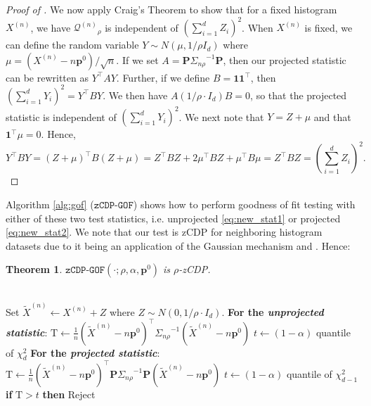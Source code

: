 \documentclass[twoside,letterpaper]{article} \usepackage{aistats2017}
\newtheorem{theorem}{Theorem}[section]
\theoremstyle{definition}
\theoremstyle{remark}
\begin{document}
\begin{proof}[Proof of ]
We now apply Craig's Theorem to show that for a fixed histogram ${X^{({n})}}$, we have ${\pmb{\mathcal{Q}}^{({n})}}_{\rho} $ is independent of $\left(\sum_{i=1}^d Z_i \right)^2$. When ${X^{({n})}}$ is fixed, we can define the random variable $Y \sim N\left(\mu, 1/\rho I_d \right)$ where $\mu = ({X^{({n})}}- n{{\mathbf{p}}^0})/\sqrt{n}$.  If we set $A = {\pmb{P}}{{\Sigma}_{{n\rho}}}^{-1}{\pmb{P}}$, then our projected statistic can be rewritten as $Y^\intercal AY$.  Further, if we define $B = {\pmb{1}}{\pmb{1}}^\intercal$, then $\left(\sum_{i=1}^d Y_i\right)^2 = Y^\intercal BY$.  We then have $A\left( 1/\rho\cdot  I_d\right) B = 0$, so that the projected statistic is independent of $\left(\sum_{i=1}^d Y_i\right)^2$.  We next note that $Y = Z + \mu$ and that ${\pmb{1}}^\intercal\mu = 0$.  Hence, 
$$
Y^\intercal BY = (Z+ \mu)^\intercal B (Z+\mu) = Z^\intercal BZ + 2\mu^\intercal B Z + \mu^\intercal B \mu = Z^\intercal B Z = \left(\sum_{i=1}^d Z_i\right)^2.
$$
\end{proof}
\fi

Algorithm \ref{alg:gof} (${\texttt{zCDP-GOF}}$) shows how to perform goodness of fit testing with either of these two test statistics, i.e. unprojected \eqref{eq:new_stat1} or projected \eqref{eq:new_stat2}.
We note that our test is zCDP for neighboring histogram datasets due to it being an application of the Gaussian mechanism and .  Hence:
\begin{theorem}
${\texttt{zCDP-GOF}}(\cdot;\rho,\alpha,{{\mathbf{p}}^0})$ is $\rho$-zCDP.
\end{theorem}

\begin{algorithm}
\caption{ zCDP Chi-Square Goodness of Fit Test}
\label{alg:gof}
\begin{algorithmic}
\\ Set ${\tilde{X}^{({n})}}\gets {X^{({n})}} + Z$ where $Z \sim N(0,1/\rho \cdot I_d)$.
\State \textbf{For the \emph{unprojected statistic}}:
\State $
{\mathrm{T}} \gets \frac{1}{n}\left({\tilde{X}^{({n})}} -n {{\mathbf{p}}^0} \right)^\intercal {{\Sigma}_{{n\rho}}}^{-1} \left({\tilde{X}^{({n})}} -n {{\mathbf{p}}^0}\right)
$
\State $t\gets (1-\alpha)$ quantile of $\chi^2_d$
\State \textbf{For the \emph{projected statistic}}:
\State $
{\mathrm{T}} \gets \frac{1}{n}  \left({\tilde{X}^{({n})}} - n{{\mathbf{p}}^0} \right)^\intercal {\pmb{P}} {{\Sigma}_{{n\rho}}}^{-1} {\pmb{P}} \left({\tilde{X}^{({n})}} - n{{\mathbf{p}}^0} \right)
$
\State $t\gets (1-\alpha)$ quantile of $\chi^2_{d-1}$\\
{\bf if }{${\mathrm{T}} > t$} {\bf then } 
  Reject
\EndProcedure
\end{algorithmic}
\end{algorithm}
 
\end{document}
